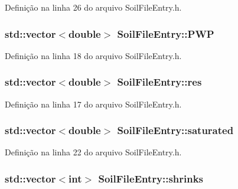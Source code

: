 Definição na linha 26 do arquivo Soil\+File\+Entry.\+h.

\subsubsection[{P\+WP}]{\setlength{\rightskip}{0pt plus 5cm}std\+::vector$<$double$>$ Soil\+File\+Entry\+::\+P\+WP\hspace{0.3cm}{\ttfamily [protected]}}\label{class_soil_file_entry_a92c8c82c79cafd0f8adb1da799ec2f6d}


Definição na linha 18 do arquivo Soil\+File\+Entry.\+h.

\subsubsection[{res}]{\setlength{\rightskip}{0pt plus 5cm}std\+::vector$<$double$>$ Soil\+File\+Entry\+::res\hspace{0.3cm}{\ttfamily [protected]}}\label{class_soil_file_entry_aeaff769b6ab4dd8a2c148a7753fe9311}


Definição na linha 17 do arquivo Soil\+File\+Entry.\+h.

\subsubsection[{saturated}]{\setlength{\rightskip}{0pt plus 5cm}std\+::vector$<$double$>$ Soil\+File\+Entry\+::saturated\hspace{0.3cm}{\ttfamily [protected]}}\label{class_soil_file_entry_ad70f39cce89e35fce298e7e44ecb2276}


Definição na linha 22 do arquivo Soil\+File\+Entry.\+h.

\subsubsection[{shrinks}]{\setlength{\rightskip}{0pt plus 5cm}std\+::vector$<$int$>$ Soil\+File\+Entry\+::shrinks\hspace{0.3cm}{\ttfamily [protected]}}\label{class_soil_file_entry_a59c3d1a058a6fef46bd031bf59d5e68b}


